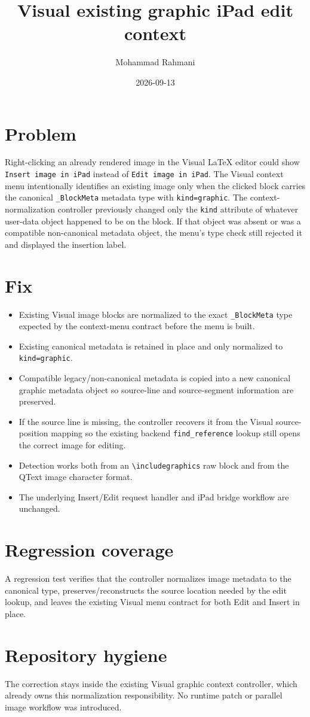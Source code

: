 \documentclass[a4paper]{article}
\title{Visual existing graphic iPad edit context}
\date{2026-09-13}
\author{Mohammad Rahmani}
\begin{document}
\maketitle

\section{Problem}
Right-clicking an already rendered image in the Visual LaTeX editor could show
\texttt{Insert image in iPad} instead of \texttt{Edit image in iPad}. The Visual
context menu intentionally identifies an existing image only when the clicked
block carries the canonical \texttt{\_BlockMeta} metadata type with
\texttt{kind=graphic}. The context-normalization controller previously changed
only the \texttt{kind} attribute of whatever user-data object happened to be on
the block. If that object was absent or was a compatible non-canonical metadata
object, the menu's type check still rejected it and displayed the insertion
label.

\section{Fix}
\begin{itemize}
   \item Existing Visual image blocks are normalized to the exact \texttt{\_BlockMeta} type expected by the context-menu contract before the menu is built.
   \item Existing canonical metadata is retained in place and only normalized to \texttt{kind=graphic}.
   \item Compatible legacy/non-canonical metadata is copied into a new canonical graphic metadata object so source-line and source-segment information are preserved.
   \item If the source line is missing, the controller recovers it from the Visual source-position mapping so the existing backend \texttt{find\_reference} lookup still opens the correct image for editing.
   \item Detection works both from an \texttt{\textbackslash includegraphics} raw block and from the QText image character format.
   \item The underlying Insert/Edit request handler and iPad bridge workflow are unchanged.
\end{itemize}

\section{Regression coverage}
A regression test verifies that the controller normalizes image metadata to the
canonical type, preserves/reconstructs the source location needed by the edit
lookup, and leaves the existing Visual menu contract for both Edit and Insert in
place.

\section{Repository hygiene}
The correction stays inside the existing Visual graphic context controller,
which already owns this normalization responsibility. No runtime patch or
parallel image workflow was introduced.
\end{document}

